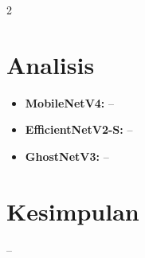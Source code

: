 \documentclass[10pt]{article}
\begin{document}
\begin{multicols}{2}
\section{Analisis}

\begin{itemize}
    \item \textbf{MobileNetV4:} --
    \item \textbf{EfficientNetV2-S:} --
    \item \textbf{GhostNetV3:} --
\end{itemize}

\section{Kesimpulan}

--

\end{multicols}
\end{document}
